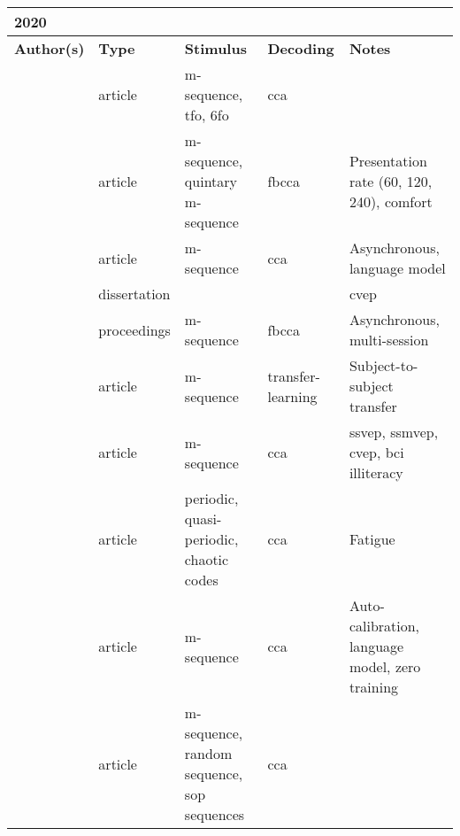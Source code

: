 \documentclass[a4paper,landscape]{article}
\begin{document}
\begin{table}[H]
	\begin{tabular}{p{5cm}p{2cm}p{5cm}p{5cm}p{6.5cm}}
		\textbf{2020} & & & & \\
		\toprule
		\textbf{Author(s)} & \textbf{Type} & \textbf{Stimulus} & \textbf{Decoding} & \textbf{Notes} \\
		\midrule
		\citeauthor{behboodi2020} & article & m-sequence, \acrshort{tfo}, \acrshort{6fo} & \acrshort{cca} & \\
		\citeauthor{gembler2020a} & article & m-sequence, quintary m-sequence & \acrshort{fbcca} & Presentation rate (60, 120, 240), comfort \\
		\citeauthor{gembler2020b} & article & m-sequence & \acrshort{cca} & Asynchronous, language model \\
		\citeauthor{gembler2020c} & dissertation & & & \acrshort{cvep} \\
		\citeauthor{gembler2020d} & proceedings & m-sequence & \acrshort{fbcca} & Asynchronous, multi-session \\
		\citeauthor{huang2020} & article & m-sequence & transfer-learning & Subject-to-subject transfer \\ 
		\citeauthor{volosyak2020} & article & m-sequence & \acrshort{cca} & \acrshort{ssvep}, \acrshort{ssmvep}, \acrshort{cvep}, \acrshort{bci} illiteracy \\
		\citeauthor{shirzhiyan2020} & article & periodic, quasi-periodic, chaotic codes & \acrshort{cca} & Fatigue \\
		\citeauthor{turi2020} & article & m-sequence & \acrshort{cca} &  Auto-calibration, language model, zero training \\
		\citeauthor{yasinzai2020} & article & m-sequence, random sequence, \acrshort{sop} sequences & \acrshort{cca} & \\
		\bottomrule
	\end{tabular}
\end{table}
\end{document}
